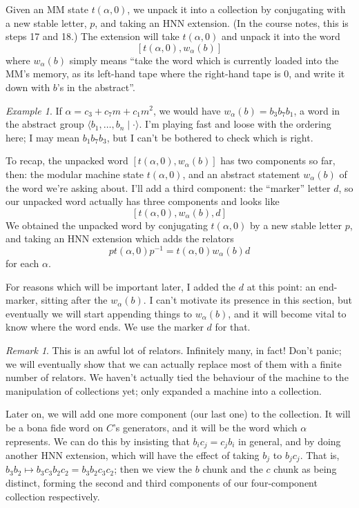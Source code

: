 \documentclass[11pt]{amsart}
\theoremstyle{remark}
\newtheorem*{remark}{Remark}
\newtheorem*{example}{Example}
\begin{document}
Given an MM state $t(\alpha, 0)$, we unpack it into a collection by conjugating with a new stable letter, $p$, and taking an HNN extension.
(In the course notes, this is steps 17 and 18.)
The extension will take $t(\alpha, 0)$ and unpack it into the word $$[t(\alpha, 0), w_{\alpha}(b)]$$
where $w_{\alpha}(b)$ simply means ``take the word which is currently loaded into the MM's memory, as its left-hand tape where the right-hand tape is $0$, and write it down with $b$'s in the abstract''.

\begin{example}
If $\alpha = c_3 + c_7 m + c_1 m^2$, we would have $w_{\alpha}(b) = b_3 b_7 b_1$, a word in the abstract group $\langle b_1, \dots, b_n \mid \cdot \rangle$.
I'm playing fast and loose with the ordering here; I may mean $b_1 b_7 b_3$, but I can't be bothered to check which is right.
\end{example}

To recap, the unpacked word $[t(\alpha, 0), w_{\alpha}(b)]$ has two components so far, then: the modular machine state $t(\alpha, 0)$, and an abstract statement $w_{\alpha}(b)$ of the word we're asking about.
I'll add a third component: the ``marker'' letter $d$, so our unpacked word actually has three components and looks like $$[t(\alpha, 0), w_{\alpha}(b), d]$$
We obtained the unpacked word by conjugating $t(\alpha, 0)$ by a new stable letter $p$, and taking an HNN extension which adds the relators $$p t(\alpha, 0) p^{-1} = t(\alpha, 0) w_{\alpha}(b) d$$
for each $\alpha$.

For reasons which will be important later, I added the $d$ at this point: an end-marker, sitting after the $w_{\alpha}(b)$.
I can't motivate its presence in this section, but eventually we will start appending things to $w_{\alpha}(b)$, and it will become vital to know where the word ends.
We use the marker $d$ for that.

\begin{remark}
This is an awful lot of relators.
Infinitely many, in fact!
Don't panic; we will eventually show that we can actually replace most of them with a finite number of relators.
We haven't actually tied the behaviour of the machine to the manipulation of collections yet; only expanded a machine into a collection.
\end{remark}

Later on, we will add one more component (our last one) to the collection.
It will be a bona fide word on $C$'s generators, and it will be the word which $\alpha$ represents.
We can do this by insisting that $b_i c_j = c_j b_i$ in general, and by doing another HNN extension,
which will have the effect of taking $b_j$ to $b_j c_j$.
That is, $b_3 b_2 \mapsto b_3 c_3 b_2 c_2 = b_3 b_2 c_3 c_2$;
then we view the $b$ chunk and the $c$ chunk as being distinct, forming the second and third components of our four-component collection respectively.
\end{document}
